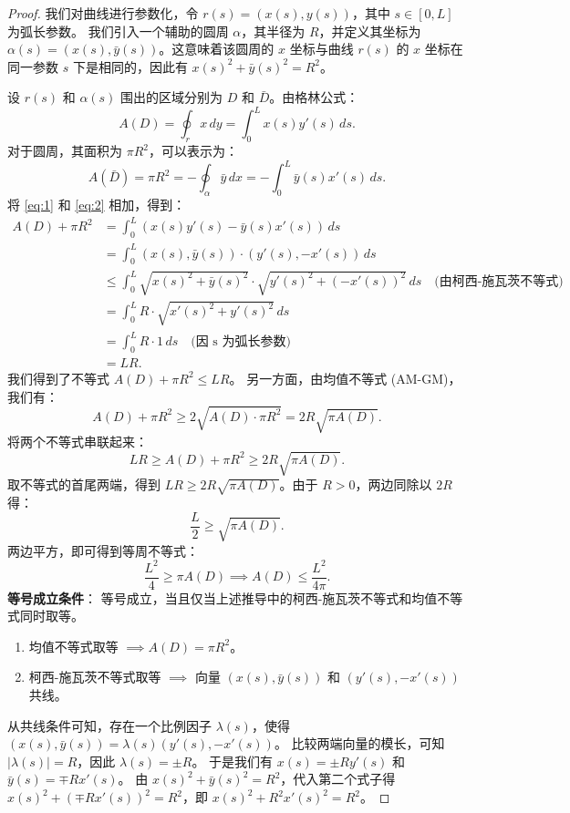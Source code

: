 \documentclass[lang=cn,10pt,thmcnt=section]{elegantbook}
\begin{document}
\begin{proof}
我们对曲线进行参数化，令 $r(s) = (x(s), y(s))$，其中 $s \in [0,L]$ 为弧长参数。
我们引入一个辅助的圆周 $\alpha$，其半径为 $R$，并定义其坐标为 $\alpha(s) = (x(s), \bar{y}(s))$。这意味着该圆周的 $x$ 坐标与曲线 $r(s)$ 的 $x$ 坐标在同一参数 $s$ 下是相同的，因此有 $x(s)^2 + \bar{y}(s)^2 = R^2$。

设 $r(s)$ 和 $\alpha(s)$ 围出的区域分别为 $D$ 和 $\bar{D}$。由格林公式：
\begin{equation}
    A(D) = \oint_{r} x \, dy = \int_0^{L} x(s) y'(s) \, ds. \label{eq:1}
\end{equation}
对于圆周，其面积为 $\pi R^2$，可以表示为：
\begin{equation}
    A(\bar{D}) = \pi R^2 = -\oint_{\alpha} \bar{y} \, dx = -\int_0^{L} \bar{y}(s) x'(s) \, ds. \label{eq:2}
\end{equation}
将 \eqref{eq:1} 和 \eqref{eq:2} 相加，得到：
\begin{align*}
    A(D) + \pi R^2 &= \int_0^{L} \left( x(s) y'(s) - \bar{y}(s) x'(s) \right) \, ds \\
    &= \int_0^{L} (x(s), \bar{y}(s)) \cdot (y'(s), -x'(s)) \, ds \\
    &\leq \int_0^{L} \sqrt{x(s)^2 + \bar{y}(s)^2} \cdot \sqrt{y'(s)^2 + (-x'(s))^2} \, ds \quad \text{(由柯西-施瓦茨不等式)} \\
    &= \int_0^{L} R \cdot \sqrt{x'(s)^2 + y'(s)^2} \, ds \\
    &= \int_0^{L} R \cdot 1 \, ds \quad \text{(因 s 为弧长参数)} \\
    &= LR.
\end{align*}
我们得到了不等式 $A(D) + \pi R^2 \leq LR$。
另一方面，由均值不等式 (AM-GM)，我们有：
\[
A(D) + \pi R^2 \geq 2 \sqrt{A(D) \cdot \pi R^2} = 2R\sqrt{\pi A(D)}.
\]
将两个不等式串联起来：
\[
LR \geq A(D) + \pi R^2 \geq 2R\sqrt{\pi A(D)}.
\]
取不等式的首尾两端，得到 $LR \geq 2R\sqrt{\pi A(D)}$。由于 $R>0$，两边同除以 $2R$ 得：
\[
\frac{L}{2} \geq \sqrt{\pi A(D)}.
\]
两边平方，即可得到等周不等式：
\[
\frac{L^2}{4} \geq \pi A(D) \implies A(D) \leq \frac{L^2}{4\pi}.
\]
\textbf{等号成立条件}：
等号成立，当且仅当上述推导中的柯西-施瓦茨不等式和均值不等式同时取等。
\begin{enumerate}
    \item 均值不等式取等 $\implies A(D) = \pi R^2$。
    \item 柯西-施瓦茨不等式取等 $\implies$ 向量 $(x(s), \bar{y}(s))$ 和 $(y'(s), -x'(s))$ 共线。
\end{enumerate}
从共线条件可知，存在一个比例因子 $\lambda(s)$，使得 $(x(s), \bar{y}(s)) = \lambda(s)(y'(s), -x'(s))$。
比较两端向量的模长，可知 $|\lambda(s)| = R$，因此 $\lambda(s) = \pm R$。
于是我们有 $x(s) = \pm R y'(s)$ 和 $\bar{y}(s) = \mp R x'(s)$。
由 $x(s)^2 + \bar{y}(s)^2 = R^2$，代入第二个式子得 $x(s)^2 + (\mp R x'(s))^2 = R^2$，即 $x(s)^2 + R^2 x'(s)^2 = R^2$。


\end{proof}
\end{document}
